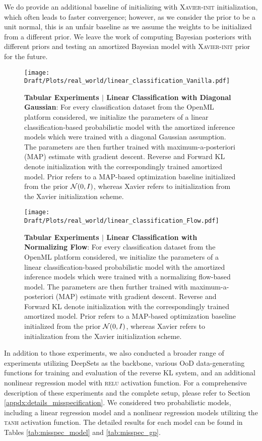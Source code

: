 We do provide an additional baseline of initializing with \textsc{Xavier-init} initialization, which often leads to faster convergence; however, as we consider the prior to be a unit normal, this is an unfair baseline as we assume the weights to be initialized from a different prior. We leave the work of computing Bayesian posteriors with different priors and testing an amortized Bayesian model with \textsc{Xavier-init} prior for the future.

\begin{figure}
    \centering
    \texttt{[image: Draft/Plots/real\_world/linear\_classification\_Vanilla.pdf]}
    \caption{\textbf{Tabular Experiments $|$ Linear Classification with Diagonal Gaussian}: For every classification dataset from the OpenML platform considered, we initialize the parameters of a linear classification-based probabilistic model with the amortized inference models which were trained with a diagonal Gaussian assumption. The parameters are then further trained with maximum-a-posteriori (MAP) estimate with gradient descent. Reverse and Forward KL denote initialization with the correspondingly trained amortized model. Prior refers to a MAP-based optimization baseline initialized from the prior ${\mathcal{N}}(0, I)$, whereas Xavier refers to initialization from the Xavier initialization scheme.}
    \vspace{-5mm}\label{fig:classification_linear_vanilla}
\end{figure}

\begin{figure}
    \centering    \texttt{[image: Draft/Plots/real\_world/linear\_classification\_Flow.pdf]}
    \caption{\textbf{Tabular Experiments $|$ Linear Classification with Normalizing Flow}: For every classification dataset from the OpenML platform considered, we initialize the parameters of a linear classification-based probabilistic model with the amortized inference models which were trained with a normalizing flow-based model. The parameters are then further trained with maximum-a-posteriori (MAP) estimate with gradient descent. Reverse and Forward KL denote initialization with the correspondingly trained amortized model. Prior refers to a MAP-based optimization baseline initialized from the prior ${\mathcal{N}}(0, I)$, whereas Xavier refers to initialization from the Xavier initialization scheme.}
    \vspace{-5mm}
    \label{fig:classification_linear_flow}
\end{figure}
In addition to those experiments, we also conducted a broader range of experiments utilizing DeepSets as the backbone, various OoD data-generating functions for training and evaluation of the reverse KL system, and an additional nonlinear regression model with \textsc{relu} activation function. For a comprehensive description of these experiments and the complete setup, please refer to Section \ref{appdx:details_misspecification}.
We considered two probabilistic models, including a linear regression model and a nonlinear regression models utilizing the \textsc{tanh} activation function. The detailed results for each model can be found in Tables \ref{tab:misspec_model} and \ref{tab:misspec_gp}.

